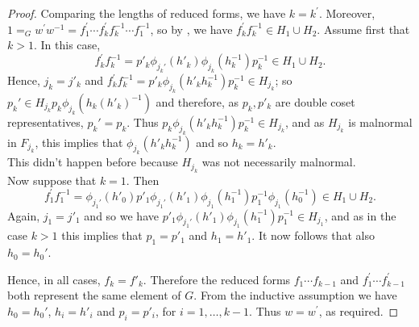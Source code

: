 \documentclass[a4paper,12pt]{article}
\numberwithin{equation}{section}
\numberwithin{figure}{section}
\begin{document}
\begin{proof}
Comparing the lengths of reduced forms, we have $k=k^\prime$.
Moreover, $1=_G w^\prime w^{-1}= f_1^\prime \cdots f_{k}^\prime
f_k^{-1}\cdots f_1^{-1}$, so by \cite[Chapter IV, Theorem 2.6]{LS}, 
we have $ f_{k}^\prime f_k^{-1}\in H_{1}\cup H_2$.
Assume first that $k>1$. 
In this case, 
\[ f_{k}^\prime f_k^{-1}= p'_k\phi_{j_k'}(h'_k)\phi_{j_k}(h_k^{-1})p_k^{-1}\in H_1\cup H_2.\] 
 Hence, $j_k=j'_k$ and 
$f_{k}^\prime f_k^{-1}=
p'_k\phi_{j_k}(h'_k h_k^{-1})p_k^{-1}\in H_{j_k}$; 
so $p_k'\in H_{j_k}p_k\phi_{j_k}(h_k (h'_k)^{-1})$ and therefore, as 
$p_k, p'_k$ are  double coset representatives,  
$p_k'=p_k$. 
Thus $p_k\phi_{j_k}(h'_k h_k^{-1})p_k^{-1}\in H_{j_k}$, and as 
$H_{j_k}$ is malnormal in $F_{j_k}$, this implies that
$\phi_{j_k}(h'_k h_k^{-1})$ and so $h_k=h'_k$.\\
This didn't happen before because $H_{j_k}$ was not 
necessarily malnormal.\\
Now suppose that $k=1$. Then 
\[
f_{1}^\prime f_1^{-1}=\phi_{j_1'}(h'_0) p'_1\phi_{j_1'}(h'_1)
\phi_{j_1}(h_1^{-1})p_1^{-1}\phi_{j_1}(h_0^{-1})\in H_1\cup H_2.
\] 
Again, $j_1=j'_1$ and so we
 have $p'_1\phi_{j_1'}(h'_1)\phi_{j_1}(h_1^{-1})p_1^{-1}
\in H_{j_1}$, 
and as in the case $k>1$ this implies that $p_1=p'_1$ and 
$h_1=h'_1$. It now follows that also $h_0=h_0'$. 
 
Hence, in all cases, $f_k=f'_k$. 
Therefore the reduced forms 
$f_1\cdots f_{k-1}$ and 
$f_1^\prime \cdots f_{k-1}^\prime$ both represent the same 
element of $G$. From the inductive assumption we have 
$h_0=h_0'$,  $h_i=h'_i$ and $p_i=p'_i$, for $i=1,\ldots, k-1$. 
Thus 
   $w=w^\prime$, as required.
\end{proof}
\end{document}
